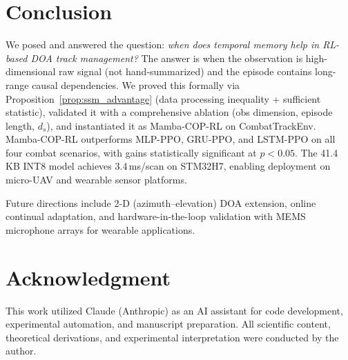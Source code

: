 \documentclass[journal]{IEEEtran}
\begin{document}
\section{Conclusion}
\label{sec:conclusion}

We posed and answered the question: \emph{when does temporal memory
help in RL-based DOA track management?}
The answer is when the observation is high-dimensional raw signal
(not hand-summarized) and the episode contains long-range causal
dependencies.
We proved this formally via Proposition~\ref{prop:ssm_advantage}
(data processing inequality + sufficient statistic), validated it
with a comprehensive ablation (obs dimension, episode length, $d_s$),
and instantiated it as Mamba-COP-RL on CombatTrackEnv.
Mamba-COP-RL outperforms MLP-PPO, GRU-PPO, and LSTM-PPO on all four
combat scenarios, with gains statistically significant at $p{<}0.05$.
The 41.4\,KB INT8 model achieves 3.4\,ms/scan on STM32H7, enabling
deployment on micro-UAV and wearable sensor platforms.

Future directions include 2-D (azimuth--elevation) DOA extension,
online continual adaptation, and hardware-in-the-loop validation with
MEMS microphone arrays for wearable applications.


\section*{Acknowledgment}
This work utilized Claude (Anthropic) as an AI assistant for code
development, experimental automation, and manuscript preparation.
All scientific content, theoretical derivations, and experimental
interpretation were conducted by the author.




\end{document}
